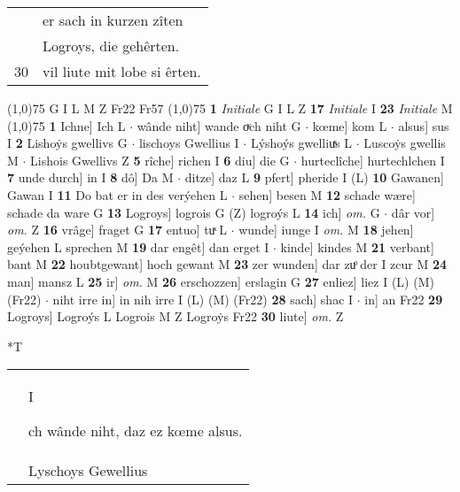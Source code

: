 \documentclass[8pt,a4paper,notitlepage]{article}
\begin{document}
\begin{table}[ht]
\begin{minipage}[t]{0.5\linewidth}
\begin{tabular}{rl}
 & er sach in kurzen zîten\\ 
 & Logroys, die gehêrten.\\ 
30 & vil liute mit lobe si êrten.\\ 
\end{tabular}
\scriptsize
\line(1,0){75} \newline
G I L M Z Fr22 Fr57 \newline
\line(1,0){75} \newline
\textbf{1} \textit{Initiale} G I L Z  \textbf{17} \textit{Initiale} I  \textbf{23} \textit{Initiale} M  \newline
\line(1,0){75} \newline
\textbf{1} Ichne] Ich L  $\cdot$ wânde niht] wande oͮch niht G  $\cdot$ kœme] kom L  $\cdot$ alsus] sus I \textbf{2} Lishoẏs gwellivs G  $\cdot$ lischoys Gwellius I  $\cdot$ Lýshoýs gwelliuͯs L  $\cdot$ Luscoẏs gwellis M  $\cdot$ Lishois Gwellivs Z \textbf{5} rîche] richen I \textbf{6} diu] die G  $\cdot$ hurteclîche] hurtechlchen I \textbf{7} unde durch] in I \textbf{8} dô] Da M  $\cdot$ ditze] daz L \textbf{9} pfert] pheride I (L) \textbf{10} Gawanen] Gawan I \textbf{11} Do bat er in des verýehen L  $\cdot$ sehen] besen M \textbf{12} schade wære] schade da ware G \textbf{13} Logroys] logrois G (Z) logroýs L \textbf{14} ich] \textit{om.} G  $\cdot$ dâr vor] \textit{om.} Z \textbf{16} vrâge] fraget G \textbf{17} entuo] tuͯ L  $\cdot$ wunde] iunge I \textit{om.} M \textbf{18} jehen] geýehen L sprechen M \textbf{19} dar engêt] dan erget I  $\cdot$ kinde] kindes M \textbf{21} verbant] bant M \textbf{22} houbtgewant] hoch gewant M \textbf{23} zer wunden] dar zuͦ der I zcur M \textbf{24} man] mansz L \textbf{25} ir] \textit{om.} M \textbf{26} erschozzen] erslagin G \textbf{27} enliez] liez I (L) (M) (Fr22)  $\cdot$ niht irre in] in nih irre I (L) (M) (Fr22) \textbf{28} sach] shac I  $\cdot$ in] an Fr22 \textbf{29} Logroys] Logroýs L Logrois M Z Logroẏs Fr22 \textbf{30} liute] \textit{om.} Z \newline
\end{minipage}
\hspace{0.5cm}
\begin{minipage}[t]{0.5\linewidth}
\small
\begin{center}*T
\end{center}
\begin{tabular}{rl}
 & \begin{large}I\end{large}ch wânde niht, daz ez kœme alsus.\\ 
 & Lyschoys Gewellius\\ 

\end{tabular}
\end{minipage}
\end{table}
\end{document}
